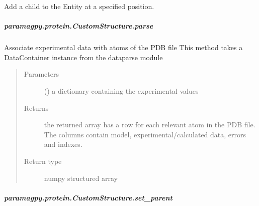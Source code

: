 \documentclass[a4paper,10pt,english,openany,oneside]{sphinxmanual}
\begin{document}
\begin{fulllineitems}
\begin{fulllineitems}
\begin{fulllineitems}
\label{\detokenize{reference/generated/paramagpy.protein.CustomStructure.insert:paramagpy.protein.CustomStructure.insert}}
Add a child to the Entity at a specified position.

\end{fulllineitems}



\subparagraph{paramagpy.protein.CustomStructure.parse}
\label{\detokenize{reference/generated/paramagpy.protein.CustomStructure.parse:paramagpy-protein-customstructure-parse}}\label{\detokenize{reference/generated/paramagpy.protein.CustomStructure.parse::doc}}

\begin{fulllineitems}
\label{\detokenize{reference/generated/paramagpy.protein.CustomStructure.parse:paramagpy.protein.CustomStructure.parse}}
Associate experimental data with atoms of the PDB file
This method takes a DataContainer instance from the
dataparse module
\begin{quote}\begin{description}
\item[{Parameters}] \leavevmode
{} () \textendash{} a dictionary containing the experimental values

\item[{Returns}] \leavevmode
{} \textendash{} the returned array has a row for each relevant atom
in the PDB file. The columns contain model,
experimental/calculated data, errors and indexes.

\item[{Return type}] \leavevmode
numpy structured array

\end{description}\end{quote}

\end{fulllineitems}



\subparagraph{paramagpy.protein.CustomStructure.set\_parent}
\label{\detokenize{reference/generated/paramagpy.protein.CustomStructure.set_parent:paramagpy-protein-customstructure-set-parent}}\label{\detokenize{reference/generated/paramagpy.protein.CustomStructure.set_parent::doc}}


\end{fulllineitems}
\end{fulllineitems}
\end{document}
